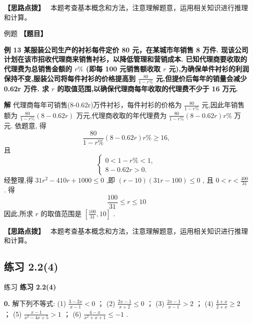 \documentclass[a4paper,10pt,oneside,fontset=none]{ctexbook}
\renewcommand{\geq}{\geqslant}
\renewcommand{\leq}{\leqslant}
\newcounter{example}[chapter]
\newenvironment{example}[1][]{\begin{exBox}{例题}{#1}}{\end{exBox}}
\newenvironment{exercise}[1][]{\begin{exBox}{练习}{#1}}{\end{exBox}}
\numberwithin{equation}{chapter}
\newenvironment{solution}{\begin{solutionBox}}{\end{solutionBox}}
\newenvironment{hint}{\begin{hintBox}\textbf{【思路点拨】}~}{\end{hintBox}}
\begin{document}
\begin{hint}
本题考查基本概念和方法，注意理解题意，运用相关知识进行推理和计算。
\end{hint}

\begin{example}
\textbf{【题目】}\par\vspace{0.3em}
\textbf{例 13 某服装公司生产的衬衫每件定价 80 元，在某城市年销售 8 万件. 现该公司计划在该市招收代理商来销售衬衫，以降低管理和营销成本. 已知代理商要收取的代理费为总销售金额的 $r\%$ (即每 100 元销售额收取 $r$ 元),为确保单件衬衫的利润保持不变,服装公司将每件衬衫的价格提高到 $\frac{80}{1 - r\% }$ 元,但提价后每年的销量会减少 0.62r 万件. 求 $r$ 的取值范围,以确保代理商每年收取的代理费不少于 16 万元.}\par\vspace{0.3em}
\end{example}

\begin{solution}
\textbf{解}
代理商每年可销售(8-0.62r)万件衬衫，每件衬衫的价格为 $\frac{80}{1 - r\% }$ 元,因此年销售额为 $\frac{80}{1 - r\% }\left( {8 - {0.62r}}\right)$ 万元,代理商收取的年代理费为 $\frac{80}{1 - r\% }\left( {8 - {0.62r}}\right) r\%$ 万元.
依题意, 得
$$
\frac{80}{1 - r\% }\left( {8 - {0.62r}}\right) r\%  \geq  {16},
$$
且
$$
\left\{  \begin{array}{l} 0 < 1 - r\%  < 1, \\  8 - {0.62r} > 0. \end{array}\right.
$$
经整理,得 ${31}{r}^{2} - {410r} + {1000} \leq  0$ ,即 $\left( {r - {10}}\right) \left( {{31r} - {100}}\right)  \leq  0$ , 且 $0 < r < \frac{400}{31}$ .
得
$$
\frac{100}{31} \leq  r \leq  {10}
$$
因此,所求 $r$ 的取值范围是 $\left\lbrack  {\frac{100}{31},{10}}\right\rbrack$ .
\end{solution}

\begin{hint}
本题考查基本概念和方法，注意理解题意，运用相关知识进行推理和计算。
\end{hint}

\subsection*{练习 2.2(4)}

\begin{exercise}
\textbf{练习 2.2(4)}\par\vspace{0.5em}
\textbf{0.} 解下列不等式: (1) $\frac{3 - {2x}}{x - 1} < 0$ ； (2) $\frac{{2x} - 1}{x + 2} \leq  0$ ； (3) $\frac{{2x} - 1}{x - 1} > 2$ ； (4) $\frac{4 + x}{2 + x} \geq  2$ ； (5) $\frac{x - 1}{{x}^{2} - {4x} + 5} > 1$ ； (6) $\frac{4 - x}{{x}^{2} + x + 1} \leq   - 1$ .
\end{exercise}
\end{document}
